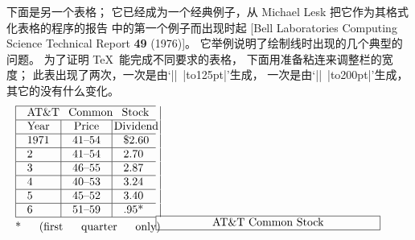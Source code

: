 {{%
\ddanger \1下面是另一个表格；
它已经成为一个经典例子，从 Michael {Lesk} 把它作为其格式化表格的程序的报告%
中的第一个例子而出现时起 [Bell Laboratories Computing Science
Technical Report {\bf 49} (1976)]。%
它举例说明了绘制线时出现的几个典型的问题。%
为了证明 \TeX\ 能完成不同要求的表格，
下面用准备粘连来调整栏的宽度；
此表出现了两次，一次是由`|\halign|~|to125pt|'生成，
一次是由`|\halign|~|to200pt|'生成，其它的没有什么变化。
$$\hbox to\hsize{%
\vbox{\tabskip=0pt \offinterlineskip
\def\tablerule{\noalign{\hrule}}
\halign to125pt{\strut#&\vrule#\tabskip=1em plus2em&
  \hfil#&\vrule#&\hfil#\hfil&\vrule#&
  \hfil#&\vrule#\tabskip=0pt\cr\tablerule
&&\multispan5\hfil AT\&T Common Stock\hfil&\cr\tablerule
&&\omit\hidewidth Year\hidewidth&&
 \omit\hidewidth Price\hidewidth&&
 \omit\hidewidth Dividend\hidewidth&\cr\tablerule
&&1971&&41--54&&\$2.60&\cr\tablerule
&&   2&&41--54&&2.70&\cr\tablerule
&&   3&&46--55&&2.87&\cr\tablerule
&&   4&&40--53&&3.24&\cr\tablerule
&&   5&&45--52&&3.40&\cr\tablerule
&&   6&&51--59&&.95\rlap*&\cr\tablerule
\noalign{\smallskip}
&\multispan7* (first quarter only)\hfil\cr
}}\hfil
\vbox{\tabskip=0pt \offinterlineskip
\def\tablerule{\noalign{\hrule}}
\halign to200pt{\strut#&\vrule#\tabskip=1em plus2em&
  \hfil#&\vrule#&\hfil#\hfil&\vrule#&
  \hfil#&\vrule#\tabskip=0pt\cr\tablerule
&&\multispan5\hfil AT\&T Common Stock\hfil&\cr\tablerule
}}}$$}}
